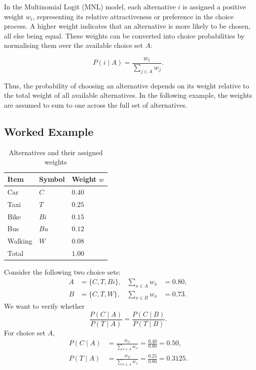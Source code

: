 \documentclass[12pt,oneside]{report}
\begin{document}
In the Multinomial Logit (MNL) model, each alternative $i$ is
assigned a positive weight $w_i$, representing its relative
attractiveness or preference in the choice process. A higher
weight indicates that an alternative is more likely to be
chosen, all else being equal. These weights can be converted
into choice probabilities by normalising them over the
available choice set $A$:

\[
P(i\mid A)=\frac{w_i}{\sum_{j\in A}w_j}.
\]

Thus, the probability of choosing an alternative depends on
its weight relative to the total weight of all available
alternatives. In the following example, the weights are
assumed to sum to one across the full set of alternatives.
\subsection{Worked Example}
\begin{table}[htbp]
    \centering
    \caption{Alternatives and their assigned weights}
    \label{tab:alternative-weights}
    \begin{tabular}{lll}
        \toprule
        Item & Symbol & Weight \(w\)\\
        \midrule
        Car     & \(C\)  & \(0.40\)\\
        Taxi    & \(T\)  & \(0.25\)\\
        Bike    & \(Bi\) & \(0.15\)\\
        Bus     & \(Bu\) & \(0.12\)\\
        Walking & \(W\)  & \(0.08\)\\
        \midrule
        Total   &        & \(1.00\)\\
        \bottomrule
    \end{tabular}
\end{table}
Consider the following two choice sets:
\begin{align*}
    A &= \{C,T,Bi\},
    &
    \sum_{x\in A}w_x &= 0.80,
    \\
    B &= \{C,T,W\},
    &
    \sum_{x\in B}w_x &= 0.73.
\end{align*}
We want to verify whether
\begin{equation}
    \frac{P(C\mid A)}{P(T\mid A)}
    =
    \frac{P(C\mid B)}{P(T\mid B)}.
\end{equation}
For choice set \(A\),
\begin{align*}
    P(C\mid A)
    &=
    \frac{w_C}{\sum_{x\in A}w_x}
    =
    \frac{0.40}{0.80}
    =
    0.50,
    \\
    P(T\mid A)
    &=
    \frac{w_T}{\sum_{x\in A}w_x}
    =
    \frac{0.25}{0.80}
    =
    0.3125.
\end{align*}
\end{document}
